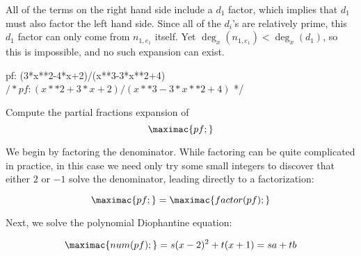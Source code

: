 All of the terms on the right hand side include a $d_1$ factor, which implies that
$d_1$ must also factor the left hand side.
Since all of the $d_i$'s are relatively
prime, this $d_1$ factor can only come from
$n_{1,e_1}$ itself.  Yet
$\deg_x (n_{1,e_1}) < \deg_x (d_1)$, so this is impossible,
and no such expansion can exist.

\endtheorem



\vfill\eject

\example

\begin{maximacode}
pf: (3*x**2-4*x+2)/(x**3-3*x**2+4) $
/* pf: (x**2+3*x+2)/(x**3-3*x**2+4) $ */
\end{maximacode}

Compute the partial fractions expansion of $$\maximac{pf;}$$

We begin by factoring the denominator.  While factoring can be quite
complicated in practice, in this case we need only try some small
integers to discover that either $2$ or $-1$ solve the denominator,
leading directly to a factorization:

\begin{comment}
Differentiating to obtain $3x^2-6x$.
Computing the GCD of $x^3-3x^2+4$ and $3x^2-6x$:

\sympyc{long_division(x**3-3*x**2+4, 3*x**2-6*x, x)}
\bigskip
\sympyc{long-division(3*x**2-6*x, -2*x+4)}


Thus, $-2x+4$ is a GCD, which we normalize by dividing through by -2
to obtain $x-2$.  We could now proceed by dividing $x^3-3x^2+4$ by
$x-2$ to obtain $x^2-x-2$ (all factors at unit power), compute the GCD
of $x-2$ and $x^2-x-2$ to obtain $x-2$ (all higher factors at unit
power), divide $x^2-x-2$ by $x-2$ to obtain $x+1$ (the unit
square-free factor), and repeat the process (trivially) with $x-2$ to
decide that $x-2$ is the second square-free factor.  Or, we could
shortcut the entire process by noting that since $x-2$ is linear,
it can only be the second square-free factor.  In any event, we conclude that:

\end{comment}

$$\maximac{pf;} = \maximac{factor(pf);}$$

Next, we solve the polynomial Diophantine equation:

$$\maximac{num(pf);} = s(x-2)^2 + t(x+1) = sa+tb$$

